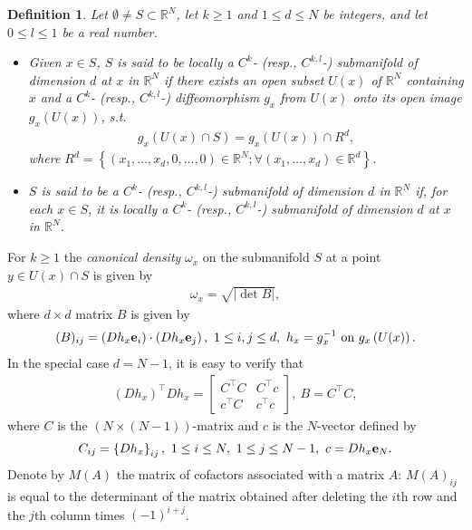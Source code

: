 \documentclass{book}
\numberwithin{equation}{section}
\newtheorem{definition}{Definition}[section]
\begin{document}
\begin{enumerate}
    \begin{definition}
        Let $\emptyset\ne S\subset\mathbb{R}^N$, let $k\ge 1$ and $1\le d\le N$ be integers, and let $0\le l\le 1$ be a real number.
        \begin{itemize}
            \item[(i)] Given $x\in S$, $S$ is said to be locally a $C^k$- (resp., $C^{k,l}$-) \emph{submanifold} of dimension $d$ at $x$ in $\mathbb{R}^N$ if there exists an open subset $U(x)$ of $\mathbb{R}^N$ containing $x$ and a $C^k$- (resp., $C^{k,l}$-) diffeomorphism $g_x$ from $U(x)$ onto its open image $g_x\left(U(x)\right)$, s.t.
            \begin{align*}
                g_x\left(U(x)\cap S\right) = g_x\left(U(x)\right)\cap R^d,
            \end{align*}
            where $R^d = \left\{(x_1,\ldots,x_d,0,\ldots,0)\in\mathbb{R}^N;\forall(x_1,\ldots,x_d)\in\mathbb{R}^d\right\}$.
            \item[(ii)] $S$ is said to be a $C^k$- (resp., $C^{k,l}$-) \emph{submanifold} of dimension $d$ in $\mathbb{R}^N$ if, for each $x\in S$, it is locally a $C^k$- (resp., $C^{k,l}$-) \emph{submanifold} of dimension $d$ at $x$ in $\mathbb{R}^N$.
        \end{itemize}
    \end{definition}
    For $k\ge 1$ the \textit{canonical density} $\omega_x$ on the submanifold $S$ at a point $y\in U(x)\cap S$ is given by
    \begin{align*}
        \omega_x = \sqrt{\left|\det B\right|},
    \end{align*}
    where $d\times d$ matrix $B$ is given by
    \begin{align*}
        (B)_{ij} = \left(Dh_x{\bf e}_i\right)\cdot\left(Dh_x{\bf e}_j\right),\ 1\le i,j\le d,\ h_x = g_x^{-1} \mbox{ on } g_x\left(U(x)\right).
    \end{align*}
    In the special case $d = N - 1$, it is easy to verify that
    \begin{align*}
        \left(Dh_x\right)^\top Dh_x = \begin{bmatrix}
            C^\top C & C^\top c\\ c^\top C & c^\top c
        \end{bmatrix},\ B = C^\top C,
    \end{align*}
    where $C$ is the $\left(N\times(N - 1)\right)$-matrix and $c$ is the $N$-vector defined by
    \begin{align*}
        C_{ij} = \left\{Dh_x\right\}_{ij},\ 1\le i\le N,\ 1\le j\le N - 1,\ c = Dh_x{\bf e}_N.
    \end{align*}
    Denote by $M(A)$ the matrix of cofactors associated with a matrix $A$: $M(A)_{ij}$ is equal to the determinant of the matrix obtained after deleting the $i$th row and the $j$th column times $(-1)^{i+j}$.
    

\end{enumerate}
\end{document}
